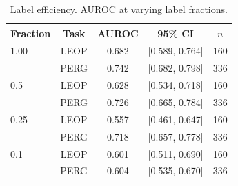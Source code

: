 \begin{table}[htbp]
\centering
\caption{Label efficiency. AUROC at varying label fractions.}
\label{tab:label-efficiency}
\begin{tabular}{lcccc}
\toprule
Fraction & Task & AUROC & 95\% CI & $n$ \\
\midrule
1.00 & LEOP & 0.682 & [0.589, 0.764] & 160 \\
 & PERG & 0.742 & [0.682, 0.798] & 336 \\
 \midrule
0.5 & LEOP & 0.628 & [0.534, 0.718] & 160 \\
 & PERG & 0.726 & [0.665, 0.784] & 336 \\
 \midrule
0.25 & LEOP & 0.557 & [0.461, 0.647] & 160 \\
 & PERG & 0.718 & [0.657, 0.778] & 336 \\
 \midrule
0.1 & LEOP & 0.601 & [0.511, 0.690] & 160 \\
 & PERG & 0.604 & [0.535, 0.670] & 336 \\
\bottomrule
\end{tabular}
\end{table}
